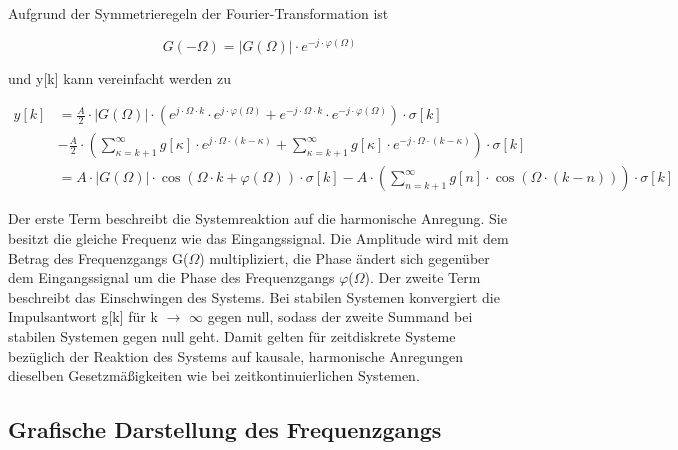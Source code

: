 \noindent Aufgrund der Symmetrieregeln der Fourier-Transformation ist 

\begin{equation}\label{eq:eighttwentyfive}
G\left(-\Omega \right)=\left|G\left(\Omega \right)\right|\cdot e^{-j\cdot \varphi \left(\Omega \right)}
\end{equation}

\noindent und y[k] kann vereinfacht werden zu

\begin{equation}\label{eq:eighttwentysix}
\begin{split}
y\left[k\right] & =\frac{A}{2} \cdot \left|G\left(\Omega \right)\right|\cdot \left(e^{j\cdot \Omega \cdot k} \cdot e^{j\cdot \varphi \left(\Omega \right)} +e^{-j\cdot \Omega \cdot k} \cdot e^{-j\cdot \varphi \left(\Omega \right)} \right)\cdot \sigma \left[k\right]\\ 
& -\frac{A}{2} \cdot \left(\sum _{\kappa =k+1}^{\infty }g\left[\kappa \right] \cdot e^{j\cdot \Omega \cdot \left(k-\kappa \right)} +\sum _{\kappa =k+1}^{\infty }g\left[\kappa \right] \cdot e^{-j\cdot \Omega \cdot \left(k-\kappa \right)} \right)\cdot \sigma \left[k\right]\\
&=A\cdot \left|G\left(\Omega \right)\right|\cdot \cos \left(\Omega \cdot k+\varphi \left(\Omega \right)\right)\cdot \sigma \left[k\right]-A\cdot \left(\sum _{n=k+1}^{\infty }g\left[n\right] \cdot \cos \left(\Omega \cdot \left(k-n\right)\right)\right)\cdot \sigma \left[k\right]
\end{split}
\end{equation}

\noindent Der erste Term beschreibt die Systemreaktion auf die harmonische Anregung. Sie besitzt die gleiche Frequenz wie das Eingangssignal. Die Amplitude wird mit dem Betrag des Frequenzgangs {\textbar}G($\Omega$){\textbar} multipliziert, die Phase \"{a}ndert sich gegen\"{u}ber dem Eingangssignal um die Phase des Frequenzgangs $\varphi$($\Omega$). Der zweite Term beschreibt das Einschwingen des Systems. Bei stabilen Systemen konvergiert die Impulsantwort g[k] f\"{u}r k $\rightarrow$ $\infty$ gegen null, sodass der zweite Summand bei stabilen Systemen gegen null geht. Damit gelten f\"{u}r zeitdiskrete Systeme bez\"{u}glich der Reaktion des Systems auf kausale, harmonische Anregungen dieselben Gesetzm\"{a}{\ss}igkeiten wie bei zeitkontinuierlichen Systemen.

\clearpage

\subsection{Grafische Darstellung des Frequenzgangs}

